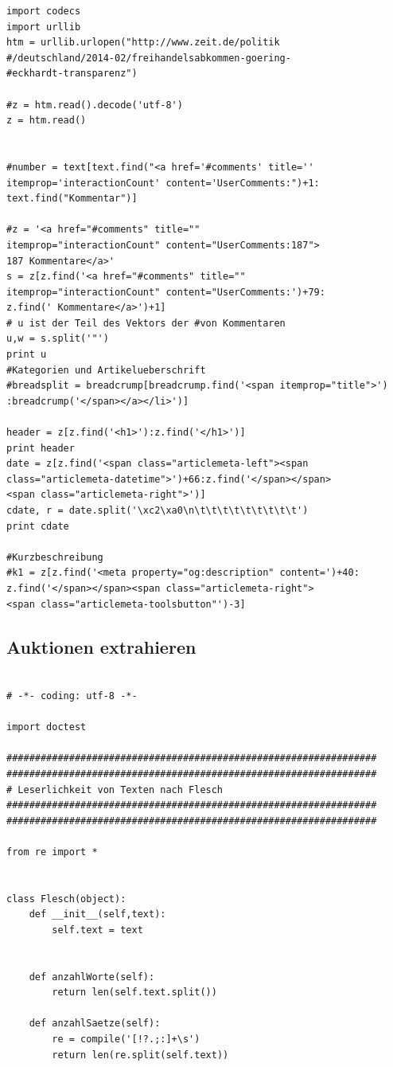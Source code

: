 \documentclass[12pt,a4paper,oneside]{article}
\begin{document}
\begin{titlepage}
\begin{flushleft}
\begin{verbatim}
import codecs
import urllib
htm = urllib.urlopen("http://www.zeit.de/politik
#/deutschland/2014-02/freihandelsabkommen-goering-
#eckhardt-transparenz")

#z = htm.read().decode('utf-8')
z = htm.read()


#number = text[text.find("<a href='#comments' title='' 
itemprop='interactionCount' content='UserComments:")+1:
text.find("Kommentar")]

#z = '<a href="#comments" title=""
itemprop="interactionCount" content="UserComments:187">
187 Kommentare</a>'
s = z[z.find('<a href="#comments" title="" 
itemprop="interactionCount" content="UserComments:')+79:
z.find(' Kommentare</a>')+1]
# u ist der Teil des Vektors der #von Kommentaren
u,w = s.split('"')
print u
#Kategorien und Artikelueberschrift
#breadsplit = breadcrump[breadcrump.find('<span itemprop="title">')
:breadcrump('</span></a></li>')]

header = z[z.find('<h1>'):z.find('</h1>')]
print header
date = z[z.find('<span class="articlemeta-left"><span 
class="articlemeta-datetime">')+66:z.find('</span></span>
<span class="articlemeta-right">')]
cdate, r = date.split('\xc2\xa0\n\t\t\t\t\t\t\t\t\t')
print cdate

#Kurzbeschreibung
#k1 = z[z.find('<meta property="og:description" content=')+40:
z.find('</span></span><span class="articlemeta-right">
<span class="articlemeta-toolsbutton"')-3]
\end{verbatim}
\subsection{Auktionen extrahieren}

\begin{verbatim}

# -*- coding: utf-8 -*-

import doctest

#################################################################
#################################################################
# Leserlichkeit von Texten nach Flesch
#################################################################
#################################################################

from re import *


class Flesch(object):
    def __init__(self,text):
        self.text = text


    def anzahlWorte(self):
        return len(self.text.split())

    def anzahlSaetze(self):
        re = compile('[!?.;:]+\s')
        return len(re.split(self.text))


\end{verbatim}
\end{flushleft}
\end{titlepage}
\end{document}
